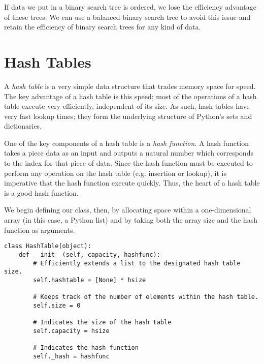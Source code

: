 If data we put in a binary search tree is ordered, we lose the efficiency advantage of these trees.
We can use a balanced binary search tree to avoid this issue and retain the efficiency of binary search trees for any kind of data.

\section*{Hash Tables}
A \emph{hash table} is a very simple data structure that trades memory space for speed.
The key advantage of a hash table is this speed; most of the operations of a hash table execute very efficiently, independent of its size.
As such, hash tables have very fast lookup times; they form the underlying structure of Python's sets and dictionaries.

One of the key components of a hash table is a \emph{hash function}.
A hash function takes a piece data as an input and outputs a natural number which corresponds to the index for that piece of data.
Since the hash function must be executed to perform any operation on the hash table (e.g. insertion or lookup), it is imperative that the hash function execute quickly.
Thus, the heart of a hash table is a good hash function.

We begin defining our  class, then, by allocating space within a one-dimensional array (in this case, a Python list) and by taking both the array size and the hash function as arguments.
\begin{lstlisting}
class HashTable(object):
    def __init__(self, capacity, hashfunc):
        # Efficiently extends a list to the designated hash table size.
        self.hashtable = [None] * hsize
        
        # Keeps track of the number of elements within the hash table.
        self.size = 0
        
        # Indicates the size of the hash table
        self.capacity = hsize
        
        # Indicates the hash function
        self._hash = hashfunc
\end{lstlisting}

